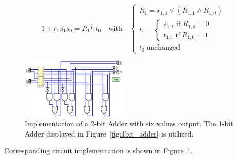 \documentclass[conference]{IEEEtran}
\begin{document}
\begin{equation}
    1 + \overline{r_1 s_1 s_0} = \overline{R_1 t_1 t_0} \quad \text{with} \quad \begin{cases}
    R_1 = r_{1,1} \vee (R_{1,1} \wedge R_{1,0}) \\ 
    t_1 = \begin{cases}
        s_{1,1} \; \text{if} \; R_{1,0} = 0 \\
        t_{1,1} \; \text{if} \; R_{1,0} = 1 
    \end{cases} \\
    t_0 \; \text{unchanged}
    \end{cases}
\end{equation}



\begin{figure}[h!]
\centering
\includegraphics[width=0.45\textwidth]{assets/2bits_adder.png}
\caption{Implementation of a 2-bit Adder with six values output. The 1-bit Adder displayed in Figure~\ref{fig:1bit_adder} is utilized.}
\label{fig:2bits_adder}
\end{figure}

Corresponding circuit implementation is shown in Figure~\ref{fig:2bits_adder}.
\end{document}
